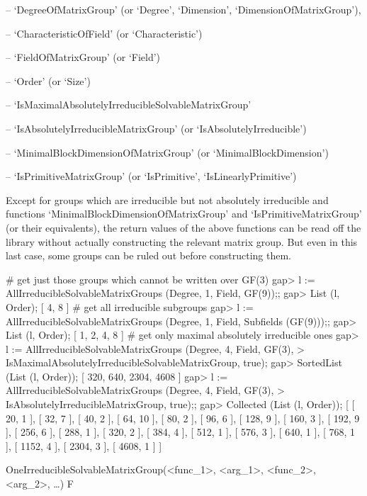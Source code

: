 \beginlist

\item{--} `DegreeOfMatrixGroup' (or `Degree', `Dimension', `DimensionOfMatrixGroup'), 
\item{--} `CharacteristicOfField' (or `Characteristic')
\item{--} `FieldOfMatrixGroup' (or `Field')
\item{--} `Order' (or `Size')
\item{--} `IsMaximalAbsolutelyIrreducibleSolvableMatrixGroup' 
\item{--} `IsAbsolutelyIrreducibleMatrixGroup' (or `IsAbsolutelyIrreducible')
\item{--} `MinimalBlockDimensionOfMatrixGroup' (or `MinimalBlockDimension')
\item{--} `IsPrimitiveMatrixGroup' (or `IsPrimitive', `IsLinearlyPrimitive')

\endlist
Except for groups which are irreducible but not absolutely irreducible and functions
`MinimalBlockDimensionOfMatrixGroup' and `IsPrimitiveMatrixGroup' (or their
equivalents), the return values of the above functions can be read off the
{\IRREDSOL} library without actually constructing the relevant matrix group.
But even in this last case, some groups can be ruled out before constructing
them.

\beginexample
# get just those groups which cannot be written over GF(3)
gap> l := AllIrreducibleSolvableMatrixGroups (Degree, 1, Field, GF(9));;
gap> List (l, Order);
[ 4, 8 ]
# get all irreducible subgroups
gap> l := AllIrreducibleSolvableMatrixGroups (Degree, 1, Field, Subfields (GF(9)));;
gap> List (l, Order);
[ 1, 2, 4, 8 ]
# get only maximal absolutely irreducible ones
gap> l := AllIrreducibleSolvableMatrixGroups (Degree, 4, Field, GF(3),
>             IsMaximalAbsolutelyIrreducibleSolvableMatrixGroup, true);
gap> SortedList (List (l, Order));
[ 320, 640, 2304, 4608 ]
gap> l := AllIrreducibleSolvableMatrixGroups (Degree, 4, Field, GF(3),
> IsAbsolutelyIrreducibleMatrixGroup, true);;
gap> Collected (List (l, Order));
[ [ 20, 1 ], [ 32, 7 ], [ 40, 2 ], [ 64, 10 ], [ 80, 2 ], [ 96, 6 ], 
  [ 128, 9 ], [ 160, 3 ], [ 192, 9 ], [ 256, 6 ], [ 288, 1 ], [ 320, 2 ], 
  [ 384, 4 ], [ 512, 1 ], [ 576, 3 ], [ 640, 1 ], [ 768, 1 ], [ 1152, 4 ], 
  [ 2304, 3 ], [ 4608, 1 ] ]
\endexample

\>OneIrreducibleSolvableMatrixGroup(<func_1>, <arg_1>, <func_2>, <arg_2>, \dots) F

